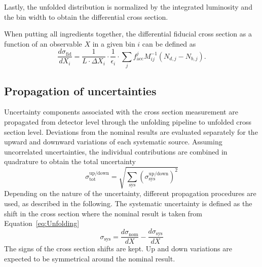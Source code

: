 Lastly, the unfolded distribution is normalized by the integrated luminosity and the bin width to obtain the differential cross section.

When putting all ingredients together, the differential fiducial cross section as a function of an observable $X$ in a given bin $i$ can be defined as
\begin{equation}
    \frac{d\sigma_\text{fid}}{dX_i} = \frac{1}{L\cdot \Delta X_i} \cdot \frac{1}{\epsilon_i} \cdot \sum_j f_{\text{acc}}^j M_{ij}^{-1} (N_{d,j}-N_{b,j}).
    \label{eq:Unfolding}
\end{equation}



\subsection{Propagation of uncertainties}

Uncertainty components associated with the cross section measurement are
propagated from detector level through the unfolding pipeline to unfolded cross
section level. Deviations from the nominal results are evaluated separately for
the upward and downward variations of each systematic source. Assuming uncorrelated uncertainties, the individual contributions are combined in quadrature to obtain the total uncertainty
\begin{equation}
	\sigma_\text{tot}^\text{up/down} = \sqrt{\sum_\text{sys} (\sigma_\text{sys}^\text{up/down})^2}
\end{equation}
Depending on the nature of the uncertainty, different propagation procedures are
used, as described in the following. 
The systematic uncertainty is defined as the shift in the cross section
where the nominal result is taken from Equation~\eqref{eq:Unfolding}
\begin{equation}
	\sigma_\text{sys} = \frac{d\sigma_\text{nom}}{dX} - \frac{d\sigma_\text{sys}}{dX}
\end{equation}
The signs of the cross section shifts are kept.
Up and down variations are expected to be symmetrical around the nominal result.

